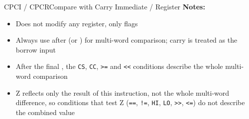 \begin{instructionbox}{CPCI / CPCR}{Compare with Carry Immediate / Register}
	\textbf{Notes:}
	\begin{itemize}
		\item Does not modify any register, only flags
		\item Always use after  (or ) for multi-word comparison; carry is treated as the borrow input
		\item After the final , the \texttt{CS}, \texttt{CC}, \texttt{>=} and \texttt{<<} conditions describe the whole
		      multi-word comparison
		\item Z reflects only the result of this instruction, not the whole multi-word difference, so conditions that test Z
		      (\texttt{==}, \texttt{!=}, \texttt{HI}, \texttt{LO}, \texttt{>>}, \texttt{<=}) do not describe the combined value
	\end{itemize}
\end{instructionbox}

